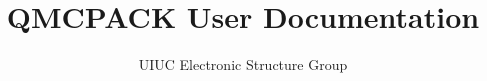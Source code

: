 \documentclass[11pt,letterpaper,fleqn]{report}
\title{QMCPACK User Documentation}
\author{UIUC Electronic Structure Group}
\begin{document}
\maketitle
\tableofcontents
\clearpage

\appendix
\clearpage
\nocite{*}
%
%


\end{document}
